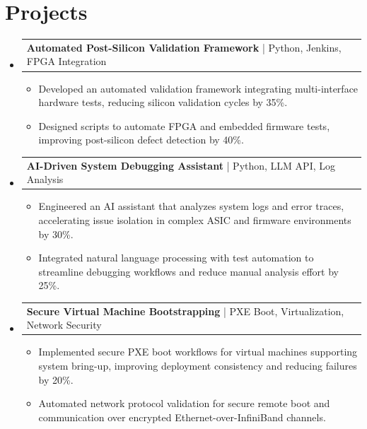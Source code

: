 \documentclass[letterpaper,11pt]{article}
\makeatletter
\newcommand{\resumeItem}[1]{
  \item\footnotesize{
    {#1 \vspace{-2pt}}
  }
}
\newcommand{\resumeProjectHeading}[2]{
    \item
    \begin{tabular*}{1.001\textwidth}{l@{\extracolsep{\fill}}r}
      \small#1 & \textbf{\small #2}\\
    \end{tabular*}\vspace{-7pt}
}
\newcommand{\resumeSubHeadingListStart}{\begin{itemize}[leftmargin=0pt, label={}]}
\newcommand{\resumeSubHeadingListEnd}{\end{itemize}}
\newcommand{\resumeItemListStart}{\begin{itemize}[leftmargin=*]}
\newcommand{\resumeItemListEnd}{\end{itemize}\vspace{-5pt}}
\makeatother
\begin{document}
\section{Projects}
    \vspace{-5pt}
    \resumeSubHeadingListStart
      \resumeProjectHeading
          {\textbf{Automated Post-Silicon Validation Framework} | Python, Jenkins, FPGA Integration}{}
          \resumeItemListStart
              \resumeItem{Developed an automated validation framework integrating multi-interface hardware tests, reducing silicon validation cycles by 35\%.}
              \resumeItem{Designed scripts to automate FPGA and embedded firmware tests, improving post-silicon defect detection by 40\%.}
          \resumeItemListEnd
          \vspace{-12pt}
      \resumeProjectHeading
          {\textbf{AI-Driven System Debugging Assistant} | Python, LLM API, Log Analysis}{}
          \resumeItemListStart
              \resumeItem{Engineered an AI assistant that analyzes system logs and error traces, accelerating issue isolation in complex ASIC and firmware environments by 30\%.}
              \resumeItem{Integrated natural language processing with test automation to streamline debugging workflows and reduce manual analysis effort by 25\%.}
          \resumeItemListEnd
          \vspace{-12pt}
      \resumeProjectHeading
          {\textbf{Secure Virtual Machine Bootstrapping} | PXE Boot, Virtualization, Network Security}{}
          \resumeItemListStart
              \resumeItem{Implemented secure PXE boot workflows for virtual machines supporting system bring-up, improving deployment consistency and reducing failures by 20\%.}
              \resumeItem{Automated network protocol validation for secure remote boot and communication over encrypted Ethernet-over-InfiniBand channels.}
          \resumeItemListEnd 
    \resumeSubHeadingListEnd
\end{document}
